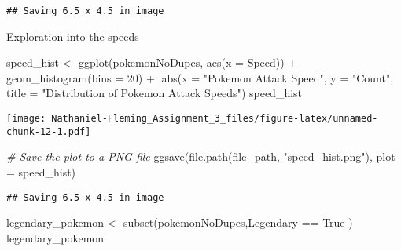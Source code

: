 \documentclass[
]{article}
\newenvironment{Shaded}{\begin{snugshade}}{\end{snugshade}}
\newcommand{\AttributeTok}[1]{\textcolor[rgb]{0.77,0.63,0.00}{#1}}
\newcommand{\CommentTok}[1]{\textcolor[rgb]{0.56,0.35,0.01}{\textit{#1}}}
\newcommand{\DecValTok}[1]{\textcolor[rgb]{0.00,0.00,0.81}{#1}}
\newcommand{\FunctionTok}[1]{\textcolor[rgb]{0.00,0.00,0.00}{#1}}
\newcommand{\NormalTok}[1]{#1}
\newcommand{\OtherTok}[1]{\textcolor[rgb]{0.56,0.35,0.01}{#1}}
\newcommand{\SpecialCharTok}[1]{\textcolor[rgb]{0.00,0.00,0.00}{#1}}
\newcommand{\StringTok}[1]{\textcolor[rgb]{0.31,0.60,0.02}{#1}}
\begin{document}
\begin{verbatim}
## Saving 6.5 x 4.5 in image
\end{verbatim}

Exploration into the speeds

\begin{Shaded}
\begin{Highlighting}[]
\NormalTok{speed\_hist }\OtherTok{\textless{}{-}} \FunctionTok{ggplot}\NormalTok{(pokemonNoDupes, }\FunctionTok{aes}\NormalTok{(}\AttributeTok{x =}\NormalTok{ Speed)) }\SpecialCharTok{+}
  \FunctionTok{geom\_histogram}\NormalTok{(}\AttributeTok{bins =} \DecValTok{20}\NormalTok{) }\SpecialCharTok{+}
  \FunctionTok{labs}\NormalTok{(}\AttributeTok{x =} \StringTok{"Pokemon Attack Speed"}\NormalTok{, }\AttributeTok{y =} \StringTok{"Count"}\NormalTok{, }\AttributeTok{title =} \StringTok{"Distribution of Pokemon Attack Speeds"}\NormalTok{)}
\NormalTok{speed\_hist}
\end{Highlighting}
\end{Shaded}

\texttt{[image: Nathaniel-Fleming\_Assignment\_3\_files/figure-latex/unnamed-chunk-12-1.pdf]}

\begin{Shaded}
\begin{Highlighting}[]
\CommentTok{\# Save the plot to a PNG file}
\FunctionTok{ggsave}\NormalTok{(}\FunctionTok{file.path}\NormalTok{(file\_path, }\StringTok{"speed\_hist.png"}\NormalTok{), }\AttributeTok{plot =}\NormalTok{ speed\_hist)}
\end{Highlighting}
\end{Shaded}

\begin{verbatim}
## Saving 6.5 x 4.5 in image
\end{verbatim}

\begin{Shaded}
\begin{Highlighting}[]
\NormalTok{legendary\_pokemon }\OtherTok{\textless{}{-}} \FunctionTok{subset}\NormalTok{(pokemonNoDupes,Legendary }\SpecialCharTok{==} \StringTok{\textquotesingle{}True\textquotesingle{}}\NormalTok{ )}
\NormalTok{legendary\_pokemon}
\end{Highlighting}
\end{Shaded}
\end{document}
